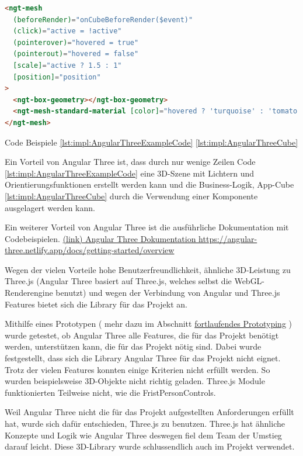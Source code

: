 \begin{lstlisting}[language=html,caption=Angular Three - App Cube,label=lst:impl:AngularThreeCube]
<ngt-mesh
  (beforeRender)="onCubeBeforeRender($event)"
  (click)="active = !active"
  (pointerover)="hovered = true"
  (pointerout)="hovered = false"
  [scale]="active ? 1.5 : 1"
  [position]="position"
>
  <ngt-box-geometry></ngt-box-geometry>
  <ngt-mesh-standard-material [color]="hovered ? 'turquoise' : 'tomato'"></ngt-mesh-standard-material>
</ngt-mesh>
\end{lstlisting}

Code Beispiele \ref{lst:impl:AngularThreeExampleCode} \ref{lst:impl:AngularThreeCube} \cite{AngularThreeDocumentationFirstScene}

Ein Vorteil von Angular Three ist, dass durch nur wenige Zeilen Code \ref{lst:impl:AngularThreeExampleCode} eine 3D-Szene mit Lichtern und Orientierungsfunktionen erstellt werden kann und die Business-Logik, App-Cube \ref{lst:impl:AngularThreeCube} durch die Verwendung einer Komponente ausgelagert werden kann.

Ein weiterer Vorteil von Angular Three ist die ausführliche Dokumentation mit Codebeispielen. \href{https://angular-three.netlify.app/docs/getting-started/overview}{(link) Angular Three Dokumentation https://angular-three.netlify.app/docs/getting-started/overview}

Wegen der vielen Vorteile hohe Benutzerfreundlichkeit, ähnliche 3D-Leistung zu Three.js (Angular Three basiert auf Three.js, welches selbst die WebGL-Renderengine benutzt) und wegen der Verbindung von Angular und Three.js Features bietet sich die Library für das Projekt an.

Mithilfe eines Prototypen ( mehr dazu im Abschnitt \hyperref[ch::ongoing-prototyping]{fortlaufendes Prototyping} ) wurde getestet, ob Angular Three alle Features, die für das Projekt benötigt werden, unterstützen kann, die für das Projekt nötig sind. Dabei wurde festgestellt, dass sich die Library Angular Three für das Projekt nicht eignet. Trotz der vielen Features konnten einige Kriterien nicht erfüllt werden. So wurden beispielsweise 3D-Objekte nicht richtig geladen. Three.js Module funktionierten Teilweise nicht, wie die FristPersonControls. 

Weil Angular Three nicht die für das Projekt aufgestellten Anforderungen erfüllt hat, wurde sich dafür entschieden, Three.js zu benutzen. Three.js hat ähnliche Konzepte und Logik wie Angular Three deswegen fiel dem Team der Umstieg darauf leicht. Diese 3D-Library wurde schlussendlich auch im Projekt verwendet.

